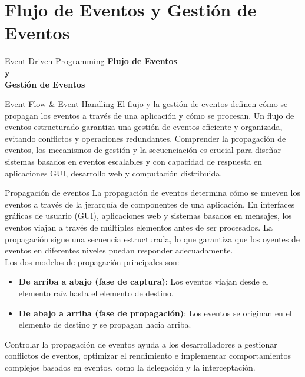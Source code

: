 \documentclass[11pt]{beamer}
\begin{document}
	\section{Flujo de Eventos y Gestión de Eventos}

	\begin{frame}{Event-Driven Programming}
		\huge \centering
		\textbf{Flujo de Eventos \\y \\Gestión de Eventos}
	\end{frame}
	
	\begin{frame}{Event Flow \& Event Handling}
	\justifying
	El flujo y la gestión de eventos definen cómo se propagan los eventos a través de una aplicación y cómo se procesan. Un flujo de eventos estructurado garantiza una gestión de eventos eficiente y organizada, evitando conflictos y operaciones redundantes. Comprender la propagación de eventos, los mecanismos de gestión y la secuenciación es crucial para diseñar sistemas basados en eventos escalables y con capacidad de respuesta en aplicaciones GUI, desarrollo web y computación distribuida.
	
	\end{frame}

	\begin{frame}{Propagación de eventos}
	\small
	La propagación de eventos determina cómo se mueven los eventos a través de la jerarquía de componentes de una aplicación. En interfaces gráficas de usuario (GUI), aplicaciones web y sistemas basados en mensajes, los eventos viajan a través de múltiples elementos antes de ser procesados. La propagación sigue una secuencia estructurada, lo que garantiza que los oyentes de eventos en diferentes niveles puedan responder adecuadamente. \\Los dos modelos de propagación principales son:
	\begin{itemize}
		\item \textbf{De arriba a abajo (fase de captura)}: Los eventos viajan desde el elemento raíz hasta el elemento de destino.
		\item \textbf{De abajo a arriba (fase de propagación)}: Los eventos se originan en el elemento de destino y se propagan hacia arriba.
	\end{itemize}
	Controlar la propagación de eventos ayuda a los desarrolladores a gestionar conflictos de eventos, optimizar el rendimiento e implementar comportamientos complejos basados en eventos, como la delegación y la interceptación.
	\end{frame}
\end{document}
